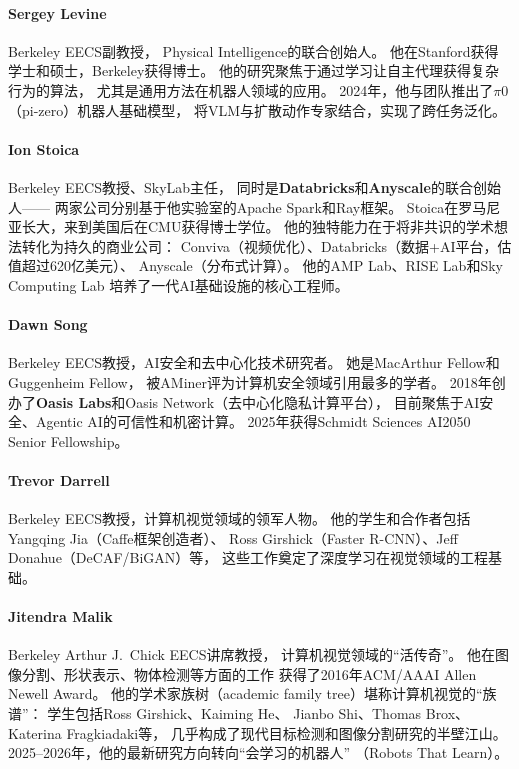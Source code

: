 \paragraph{Sergey Levine}
Berkeley EECS副教授，
Physical Intelligence的联合创始人。
他在Stanford获得学士和硕士，Berkeley获得博士。
他的研究聚焦于通过学习让自主代理获得复杂行为的算法，
尤其是通用方法在机器人领域的应用。
2024年，他与团队推出了$\pi$0（pi-zero）机器人基础模型，
将VLM与扩散动作专家结合，实现了跨任务泛化。

\paragraph{Ion Stoica}
Berkeley EECS教授、SkyLab主任，
同时是\textbf{Databricks}和\textbf{Anyscale}的联合创始人——
两家公司分别基于他实验室的Apache Spark和Ray框架。
Stoica在罗马尼亚长大，来到美国后在CMU获得博士学位。
他的独特能力在于将非共识的学术想法转化为持久的商业公司：
Conviva（视频优化）、Databricks（数据+AI平台，估值超过620亿美元）、
Anyscale（分布式计算）。
他的AMP Lab、RISE Lab和Sky Computing Lab
培养了一代AI基础设施的核心工程师。

\paragraph{Dawn Song}
Berkeley EECS教授，AI安全和去中心化技术研究者。
她是MacArthur Fellow和Guggenheim Fellow，
被AMiner评为计算机安全领域引用最多的学者。
2018年创办了\textbf{Oasis Labs}和Oasis Network（去中心化隐私计算平台），
目前聚焦于AI安全、Agentic AI的可信性和机密计算。
2025年获得Schmidt Sciences AI2050 Senior Fellowship。

\paragraph{Trevor Darrell}
Berkeley EECS教授，计算机视觉领域的领军人物。
他的学生和合作者包括Yangqing Jia（Caffe框架创造者）、
Ross Girshick（Faster R-CNN）、Jeff Donahue（DeCAF/BiGAN）等，
这些工作奠定了深度学习在视觉领域的工程基础。

\paragraph{Jitendra Malik}
Berkeley Arthur J.\ Chick EECS讲席教授，
计算机视觉领域的``活传奇''。
他在图像分割、形状表示、物体检测等方面的工作
获得了2016年ACM/AAAI Allen Newell Award。
他的学术家族树（academic family tree）堪称计算机视觉的``族谱''：
学生包括Ross Girshick、Kaiming He、
Jianbo Shi、Thomas Brox、Katerina Fragkiadaki等，
几乎构成了现代目标检测和图像分割研究的半壁江山。
2025--2026年，他的最新研究方向转向``会学习的机器人''
（Robots That Learn）。

